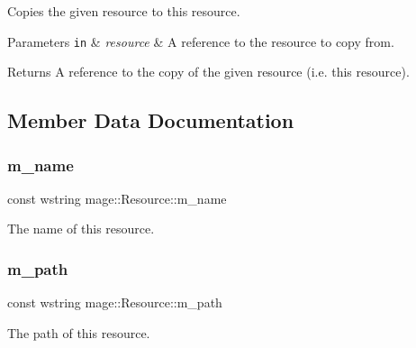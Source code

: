 Copies the given resource to this resource.


\begin{DoxyParams}[1]{Parameters}
\mbox{\tt in}  & {\em resource} & A reference to the resource to copy from. \\
\hline
\end{DoxyParams}
\begin{DoxyReturn}{Returns}
A reference to the copy of the given resource (i.\+e. this resource). 
\end{DoxyReturn}


\subsection{Member Data Documentation}
\hypertarget{classmage_1_1_resource_a62a281fb52790af4c621bb6aeee3bbe5}{}\label{classmage_1_1_resource_a62a281fb52790af4c621bb6aeee3bbe5} 
\subsubsection{\texorpdfstring{m\+\_\+name}{m\_name}}
{\footnotesize\ttfamily const wstring mage\+::\+Resource\+::m\+\_\+name\hspace{0.3cm}{\ttfamily [private]}}

The name of this resource. \hypertarget{classmage_1_1_resource_aa85318935a58bc4f7b3cfa5c19543d94}{}\label{classmage_1_1_resource_aa85318935a58bc4f7b3cfa5c19543d94} 
\subsubsection{\texorpdfstring{m\+\_\+path}{m\_path}}
{\footnotesize\ttfamily const wstring mage\+::\+Resource\+::m\+\_\+path\hspace{0.3cm}{\ttfamily [private]}}

The path of this resource. 